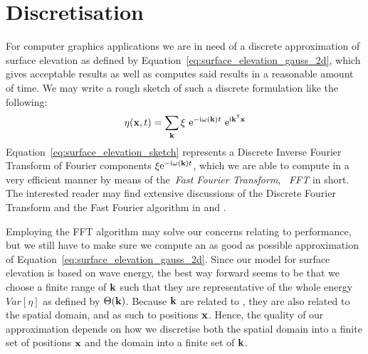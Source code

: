\section{Discretisation}
\label{sec:random_sea_discretisation}
For computer graphics applications we are in need of a discrete approximation 
of surface elevation as defined by 
Equation~\ref{eq:surface_elevation_gauss_2d}, 
which gives acceptable results as well as computes said results in a reasonable 
amount of time. We may write a rough sketch of such a discrete formulation like 
the following:
\begin{equation}
\label{eq:surface_elevation_sketch}
 \eta(\mathbf{x}, t) = \sum_{\mathbf{k}} 
\xi~\mathrm{e}^{-\mathrm{i}\omega(\mathbf{k}) t}
~\mathrm{e}^{\mathrm{i}\mathbf{k}^{\mathsf{T}}\mathbf{x}}
\end{equation}
Equation~\ref{eq:surface_elevation_sketch} represents a Discrete Inverse 
Fourier Transform of Fourier components 
$\xi\mathrm{e}^{-\mathrm{i}\omega(\mathbf{k}) t}$, which we are able to compute in 
a very efficient manner by means of the~\emph{Fast Fourier Transform}, 
~\emph{FFT} in short. The interested reader may find extensive discussions of 
the Discrete Fourier Transform and the Fast Fourier algorithm
in \cite{book:bracewell2000fourier} and \cite{book:numericalrecipes}.

Employing the FFT algorithm may solve our concerns relating to performance, but 
we still have to make sure we compute an as good as possible approximation of 
Equation~\ref{eq:surface_elevation_gauss_2d}. Since our model for surface 
elevation is based on wave energy, the best way forward seems to be that we 
choose a finite range of \wavevectors $\mathbf{k}$ such that they are 
representative of the whole energy $Var[\eta]$ as defined by $\Theta(\mathbf{k})$. 
Because \wavevectors $\mathbf{k}$ are related to \wavelength, they are also 
related to the spatial domain, and as such to positions $\mathbf{x}$. Hence, the 
quality of our approximation depends on how we discretise both the spatial 
domain into a finite set of positions $\mathbf{x}$ and the \wavevector domain 
into a finite set of \wavevectors $\mathbf{k}$.
%

